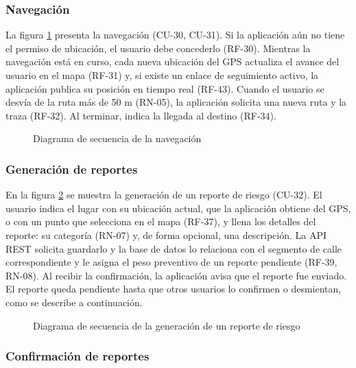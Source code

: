 \subsubsection{Navegación}

La figura \ref{fig:sd_navegacion} presenta la navegación (CU-30, CU-31). Si la aplicación aún no tiene el permiso de ubicación, el usuario debe concederlo (RF-30). Mientras la navegación está en curso, cada nueva ubicación del GPS actualiza el avance del usuario en el mapa (RF-31) y, si existe un enlace de seguimiento activo, la aplicación publica su posición en tiempo real (RF-43). Cuando el usuario se desvía de la ruta más de 50 m (RN-05), la aplicación solicita una nueva ruta y la traza (RF-32). Al terminar, indica la llegada al destino (RF-34).

\begin{figure}[htbp]
    \centering
    
    \caption{Diagrama de secuencia de la navegación}
    \label{fig:sd_navegacion}
\end{figure}

\subsubsection{Generación de reportes}

En la figura \ref{fig:sd_reporte} se muestra la generación de un reporte de riesgo (CU-32). El usuario indica el lugar con su ubicación actual, que la aplicación obtiene del GPS, o con un punto que selecciona en el mapa (RF-37), y llena los detalles del reporte: su categoría (RN-07) y, de forma opcional, una descripción. La API REST solicita guardarlo y la base de datos lo relaciona con el segmento de calle correspondiente y le asigna el peso preventivo de un reporte pendiente (RF-39, RN-08). Al recibir la confirmación, la aplicación avisa que el reporte fue enviado. El reporte queda pendiente hasta que otros usuarios lo confirmen o desmientan, como se describe a continuación.

\begin{figure}[htbp]
    \centering
    
    \caption{Diagrama de secuencia de la generación de un reporte de riesgo}
    \label{fig:sd_reporte}
\end{figure}

\subsubsection{Confirmación de reportes}


